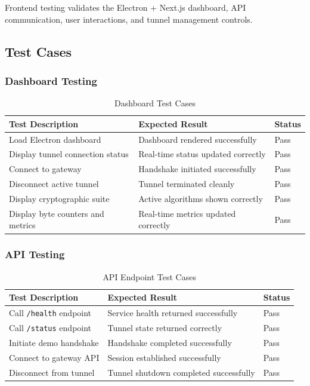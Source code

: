 Frontend testing validates the Electron + Next.js dashboard, API communication, user interactions, and tunnel management controls.

\subsection{Test Cases}

\subsubsection{Dashboard Testing}

\begin{table}[H]
\centering
\begin{tabularx}{\textwidth}{|X|X|l|}
\hline
\textbf{Test Description} & \textbf{Expected Result} & \textbf{Status} \\ \hline
Load Electron dashboard & Dashboard rendered successfully & Pass \\ \hline
Display tunnel connection status & Real-time status updated correctly & Pass \\ \hline
Connect to gateway & Handshake initiated successfully & Pass \\ \hline
Disconnect active tunnel & Tunnel terminated cleanly & Pass \\ \hline
Display cryptographic suite & Active algorithms shown correctly & Pass \\ \hline
Display byte counters and metrics & Real-time metrics updated correctly & Pass \\ \hline
\end{tabularx}
\caption{Dashboard Test Cases}
\end{table}

\subsubsection{API Testing}

\begin{table}[H]
\centering
\begin{tabularx}{\textwidth}{|X|X|l|}
\hline
\textbf{Test Description} & \textbf{Expected Result} & \textbf{Status} \\ \hline
Call \texttt{/health} endpoint & Service health returned successfully & Pass \\ \hline
Call \texttt{/status} endpoint & Tunnel state returned correctly & Pass \\ \hline
Initiate demo handshake & Handshake completed successfully & Pass \\ \hline
Connect to gateway API & Session established successfully & Pass \\ \hline
Disconnect from tunnel & Tunnel shutdown completed successfully & Pass \\ \hline
\end{tabularx}
\caption{API Endpoint Test Cases}
\end{table}


